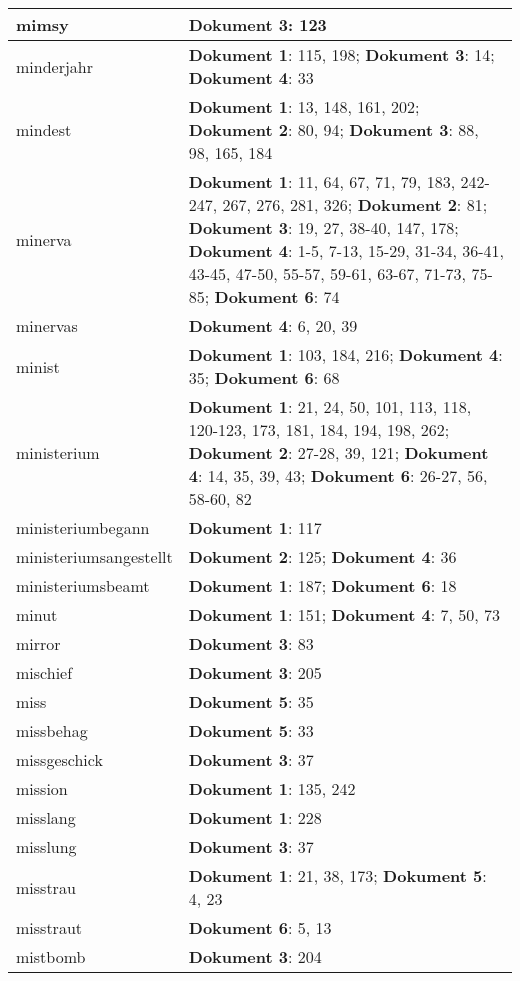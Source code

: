 \documentclass[a5paper]{article}
\begin{document}
\begin{longtable}[l]{|l|p{3in}|}
\hline
mimsy & \textbf{Dokument 3}: 123 \\
\hline
minderjahr & \textbf{Dokument 1}: 115, 198; \textbf{Dokument 3}: 14; \textbf{Dokument 4}: 33 \\
\hline
mindest & \textbf{Dokument 1}: 13, 148, 161, 202; \textbf{Dokument 2}: 80, 94; \textbf{Dokument 3}: 88, 98, 165, 184 \\
\hline
minerva & \textbf{Dokument 1}: 11, 64, 67, 71, 79, 183, 242-247, 267, 276, 281, 326; \textbf{Dokument 2}: 81; \textbf{Dokument 3}: 19, 27, 38-40, 147, 178; \textbf{Dokument 4}: 1-5, 7-13, 15-29, 31-34, 36-41, 43-45, 47-50, 55-57, 59-61, 63-67, 71-73, 75-85; \textbf{Dokument 6}: 74 \\
\hline
minervas & \textbf{Dokument 4}: 6, 20, 39 \\
\hline
minist & \textbf{Dokument 1}: 103, 184, 216; \textbf{Dokument 4}: 35; \textbf{Dokument 6}: 68 \\
\hline
ministerium & \textbf{Dokument 1}: 21, 24, 50, 101, 113, 118, 120-123, 173, 181, 184, 194, 198, 262; \textbf{Dokument 2}: 27-28, 39, 121; \textbf{Dokument 4}: 14, 35, 39, 43; \textbf{Dokument 6}: 26-27, 56, 58-60, 82 \\
\hline
ministeriumbegann & \textbf{Dokument 1}: 117 \\
\hline
ministeriumsangestellt & \textbf{Dokument 2}: 125; \textbf{Dokument 4}: 36 \\
\hline
ministeriumsbeamt & \textbf{Dokument 1}: 187; \textbf{Dokument 6}: 18 \\
\hline
minut & \textbf{Dokument 1}: 151; \textbf{Dokument 4}: 7, 50, 73 \\
\hline
mirror & \textbf{Dokument 3}: 83 \\
\hline
mischief & \textbf{Dokument 3}: 205 \\
\hline
miss & \textbf{Dokument 5}: 35 \\
\hline
missbehag & \textbf{Dokument 5}: 33 \\
\hline
missgeschick & \textbf{Dokument 3}: 37 \\
\hline
mission & \textbf{Dokument 1}: 135, 242 \\
\hline
misslang & \textbf{Dokument 1}: 228 \\
\hline
misslung & \textbf{Dokument 3}: 37 \\
\hline
misstrau & \textbf{Dokument 1}: 21, 38, 173; \textbf{Dokument 5}: 4, 23 \\
\hline
misstraut & \textbf{Dokument 6}: 5, 13 \\
\hline
mistbomb & \textbf{Dokument 3}: 204 \\

\end{longtable}
\end{document}
